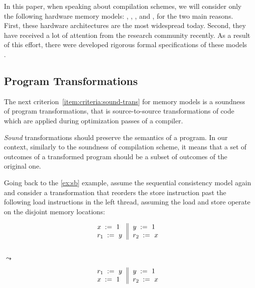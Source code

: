 In this paper, when speaking about compilation schemes, 
we will consider only the following hardware memory models: 
\Intel, , , and \POWER, 
for the two main reasons. 
First, these hardware architectures are the 
most widespread today.
Second, they have received a lot of attention 
from the research community recently. 
As a result of this effort, 
there were developed rigorous formal 
specifications of these models~%
\cite{Sewell-al:CACM10, Sarkar-al:PLDI11, 
Flur-al:POPL16, Pulte-al:POPL18}. 

\subsection{Program Transformations}
\label{sec:background:trans}

The next criterion~\ref{item:criteria:sound-trans} 
for memory models is a soundness of program transformations, 
that is source-to-source transformations of code which are applied during 
optimization passes of a compiler. 

\emph{Sound} transformations should preserve the semantics 
of a program. In our context, similarly to the 
soundness of compilation scheme, it means that 
a set of outcomes of a transformed program 
should be a subset of outcomes of the original one. 

Going back to the \ref{ex:sb} example, 
assume the sequential consistency model again and
consider a transformation that reorders 
the store instruction past the following load 
instructions in the left thread, 
assuming the load and store operate on 
the disjoint memory locations:

\begin{minipage}{0.45\linewidth}
\begin{equation*}
\inarrII{
   \writeInst{}{x}{1}   \\
   \readInst{}{r_1}{y}  \\
}{
  \writeInst{}{y}{1}   \\
  \readInst{}{r_2}{x}  \\
}
\end{equation*}
\end{minipage}\hfill%
\begin{minipage}{0.05\linewidth}
\Large~\\ $\leadsto$
\end{minipage}\hfill%
\begin{minipage}{0.45\linewidth}
\begin{equation*}
\inarrII{
   \readInst{}{r_1}{y}  \\
   \writeInst{}{x}{1}   \\
}{
  \writeInst{}{y}{1}   \\
  \readInst{}{r_2}{x}  \\
}
\end{equation*}
\end{minipage}

